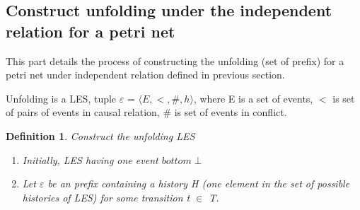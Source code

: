 \documentclass[11pt]{article}
\newtheorem{definition}{Definition}
\begin{document}
\subsection{Construct unfolding under the independent relation for a petri net}
	This part details the process of constructing the unfolding (set of prefix) for a petri net under independent 			relation defined in previous section.
	
	Unfolding is a LES, tuple $\varepsilon$ = $\langle E,<,\#,h\rangle$, where E is a set of events, $<$ is set of 			pairs of events in causal relation, $\#$ is set of events in conflict.
	
	\begin{definition}{Construct the unfolding LES}
	
	\begin{enumerate}
		\item Initially, LES having one event $bottom \perp$
		
		\item Let $\varepsilon$ be an prefix containing a history H (one element in the set of possible histories of 				LES) for some transition t $\in$ T.
		
	\end{enumerate}
	\end{definition}
\end{document}
